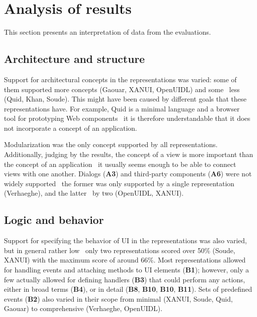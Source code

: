 \section{Analysis of results}\label{sec:analysis-of-results}
This section presents an interpretation of data from the evaluations.


\subsection{Architecture and structure}\label{subsec:4-2-architecture-and-structure}
Support for architectural concepts in the representations was varied: some of them supported more concepts (Gaouar, XANUI, OpenUIDL) and some \textendash\ less (Quid, Khan, Soude).
This might have been caused by different goals that these representations have.
For example, Quid is a minimal language and a browser tool for prototyping Web components \textendash\ it is therefore understandable that it does not incorporate a concept of an application.

Modularization was the only concept supported by all representations.
Additionally, judging by the results, the concept of a view is more important than the concept of an application \textendash\ it usually seems enough to be able to connect views with one another.
Dialogs (\textbf{A3}) and third-party components (\textbf{A6}) were not widely supported \textendash\ the former was only supported by a single representation (Verhaeghe), and the latter \textendash\ by two (OpenUIDL, XANUI).

\subsection{Logic and behavior}\label{subsec:4-2-logic-and-behavior}
Support for specifying the behavior of UI in the representations was also varied, but in general rather low \textendash\ only two representations scored over 50\% (Soude, XANUI) with the maximum score of around 66\%.
Most representations allowed for handling events and attaching methods to UI elements (\textbf{B1});
however, only a few actually allowed for defining handlers (\textbf{B3}) that could perform any actions, either in broad terms (\textbf{B4}), or in detail (\textbf{B8}, \textbf{B10}, \textbf{B10}, \textbf{B11}).
Sets of predefined events (\textbf{B2}) also varied in their scope from minimal (XANUI, Soude, Quid, Gaouar) to comprehensive (Verhaeghe, OpenUIDL).

